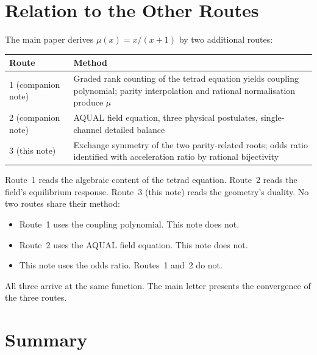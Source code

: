 \documentclass[twocolumn]{iopjournal}
\begin{document}

\section*{Relation to the Other Routes}

The main paper derives $\mu(x) = x/(x+1)$ by two additional
routes:

\vspace{6pt}
\noindent
\begin{tabular*}{\columnwidth}{@{\extracolsep{\fill}}lp{}@{}}
\hline
Route & Method \\
\hline
1 (companion note) & Graded rank counting of the tetrad
  equation yields coupling polynomial; parity interpolation
  and rational normalisation produce
  $\mu$~\cite{Nelson2026metric} \\
2 (companion note) & AQUAL field equation, three physical
  postulates, single-channel detailed
  balance~\cite{Nelson2026equilibrium} \\
3 (this note) & Exchange symmetry of the two parity-related
  roots; odds ratio identified with acceleration ratio by
  rational bijectivity \\
\hline
\end{tabular*}
\vspace{6pt}

Route~1 reads the algebraic content of the tetrad equation.
Route~2 reads the field's equilibrium response. Route~3 (this
note) reads the geometry's duality. No two routes share their
method:

\begin{itemize}
\item Route~1 uses the coupling polynomial. This note does not.
\item Route~2 uses the AQUAL field equation. This note does not.
\item This note uses the odds ratio. Routes~1 and~2 do not.
\end{itemize}

All three arrive at the same function. The main letter presents
the convergence of the three routes.


\section*{Summary}
\end{document}
